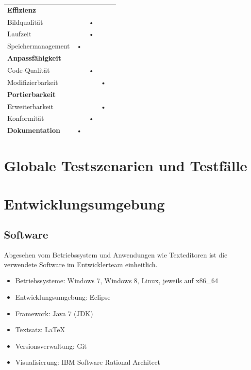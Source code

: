 \documentclass[10pt]{scrreprt}
\begin{document}
\begin{center}
\begin{tabular}{lcccc}
\hline 
\rule[-1ex]{0pt}{4ex} \textbf{Effizienz} &  &  &  &  \\ 
\rule[-1ex]{0pt}{4ex} \hspace{10pt} Bildqualität & & • & & \\ 
\rule[-1ex]{0pt}{4ex} \hspace{10pt} Laufzeit & & • & & \\ 
\rule[-1ex]{0pt}{4ex} \hspace{10pt} Speichermanagement & • & & & \\ 

\hline 
\rule[-1ex]{0pt}{4ex} \textbf{Anpassfähigkeit} &  &  &  &  \\ 
\rule[-1ex]{0pt}{4ex} \hspace{10pt} Code-Qualität & & • & & \\ 
\rule[-1ex]{0pt}{4ex} \hspace{10pt} Modifizierbarkeit & & & • & \\ 

\hline 
\rule[-1ex]{0pt}{4ex} \textbf{Portierbarkeit} &  &  &  &  \\ 
\rule[-1ex]{0pt}{4ex} \hspace{10pt} Erweiterbarkeit & & & • & \\ 
\rule[-1ex]{0pt}{4ex} \hspace{10pt} Konformität & & • & & \\ 

\hline 
\rule[-1ex]{0pt}{4ex} \textbf{Dokumentation} & • & & & \\ 
\hline 
\end{tabular} 
\end{center}




\chapter{Globale Testszenarien und Testfälle}





\chapter{Entwicklungsumgebung}
\section{Software}
Abgesehen vom Betriebssystem und Anwendungen wie Texteditoren ist die verwendete Software im Entwicklerteam einheitlich.
\begin{itemize}
\item Betriebssysteme: Windows 7, Windows 8, Linux, jeweils auf x86{\_}64
\item Entwicklungsumgebung: Eclipse
\item Framework: Java 7 (JDK)
\item Textsatz: \LaTeX
\item Versionsverwaltung: Git
\item Visualisierung: IBM Software Rational Architect
\end{itemize}
\end{document}
